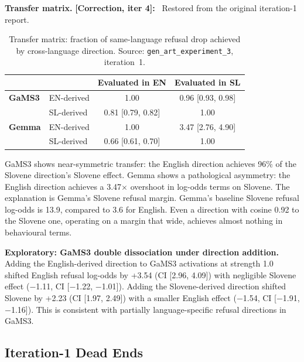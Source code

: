\documentclass[11pt,letterpaper]{article}
\newcommand{\corr}[1]{\noindent\textbf{[Correction, iter #1]:}~}
\begin{document}
\textbf{Transfer matrix.} \corr{4} Restored from the original iteration-1 report.

\begin{table}[!htbp]
\centering
\caption{Transfer matrix: fraction of same-language refusal drop achieved by cross-language direction. Source: \texttt{gen\_art\_experiment\_3}, iteration~1.}
\label{tab:iter1_transfer}
\small
\begin{tabular}{llcc}
\toprule
& & Evaluated in EN & Evaluated in SL \\
\midrule
\textbf{GaMS3} & EN-derived & 1.00 & 0.96 [0.93, 0.98] \\
& SL-derived & 0.81 [0.79, 0.82] & 1.00 \\
\textbf{Gemma} & EN-derived & 1.00 & 3.47 [2.76, 4.90] \\
& SL-derived & 0.66 [0.61, 0.70] & 1.00 \\
\bottomrule
\end{tabular}
\end{table}

GaMS3 shows near-symmetric transfer: the English direction achieves 96\% of the Slovene direction's Slovene effect. Gemma shows a pathological asymmetry: the English direction achieves a 3.47$\times$ overshoot in log-odds terms on Slovene. The explanation is Gemma's Slovene refusal margin. Gemma's baseline Slovene refusal log-odds is 13.9, compared to 3.6 for English. Even a direction with cosine 0.92 to the Slovene one, operating on a margin that wide, achieves almost nothing in behavioural terms.

\textbf{Exploratory: GaMS3 double dissociation under direction addition.} Adding the English-derived direction to GaMS3 activations at strength 1.0 shifted English refusal log-odds by +3.54 (CI [2.96, 4.09]) with negligible Slovene effect ($-$1.11, CI [$-$1.22, $-$1.01]). Adding the Slovene-derived direction shifted Slovene by +2.23 (CI [1.97, 2.49]) with a smaller English effect ($-$1.54, CI [$-$1.91, $-$1.16]). This is consistent with partially language-specific refusal directions in GaMS3.


\subsection{Iteration-1 Dead Ends}
\end{document}
